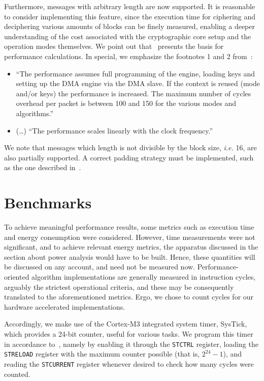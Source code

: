\documentclass{../sftex/sftex}
\begin{document}
Furthermore, messages with arbitrary length are now supported. It is reasonable
to consider implementing this feature, since the execution time for ciphering
and deciphering various amounts of blocks can be finely measured, enabling a
deeper understanding of the cost associated with the cryptographic core setup
and the operation modes themselves. We point out that~\cite[Sec.
22.2.4]{Texas:report:2013:may} presents the basis for performance calculations.
In special, we emphasize the footnotes 1 and 2 from~\cite[Table
22--88]{Texas:report:2013:may}:

\begin{itemize}

  \item ``The performance assumes full programming of the engine, loading keys
      and setting up the DMA engine via the DMA slave. If the context is reused
        (mode and/or keys) the performance is increased. The maximum number of
        cycles overhead per packet is between 100 and 150 for the various modes
        and algorithms.''

   \item (\ldots) ``The performance scales linearly with the clock frequency.''

\end{itemize}

We note that messages which length is not divisible by the block size,
\emph{i.e.} 16, are also partially supported. A correct padding strategy must
be implemented, such as the one described in~\cite{Kaliski:report:1998:mar}.

\section{Benchmarks}

To achieve meaningful performance results, some metrics such as execution time
and energy consumption were considered. However, time measurements were not
significant, and to achieve relevant energy metrics, the apparatus discussed in
the section about power analysis would have to be built. Hence, these
quantities will be discussed on any account, and need not be measured now.
Performance-oriented algorithm implementations are generally measured in
instruction cycles, arguably the strictest operational criteria, and these may
be consequently translated to the aforementioned metrics. Ergo, we chose to
count cycles for our hardware accelerated implementations.

Accordingly, we make use of the Cortex-M3 integrated system timer, SysTick,
which provides a 24-bit counter, useful for various tasks. We program this
timer in accordance to~\cite[Sec. 3.4]{Texas:report:2013:may}, namely by
enabling it through the \verb!STCTRL! register, loading the \verb!STRELOAD!
register with the maximum counter possible (that is, $2^{24} - 1$), and reading
the \verb!STCURRENT! register whenever desired to check how many cycles were
counted.
\end{document}
